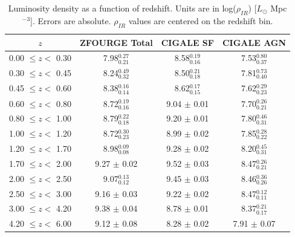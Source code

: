 \begin{table}
    \begin{center}
    \caption{Luminosity density as a function of redshift. Units are in log($\rho_{IR}$) [$L_{\odot}$ Mpc$^{-3}$]. Errors are absolute. $\rho_{IR}$ values are centered on the redshift bin.}
    \label{Tab: SFRD}
    \begin{tabular}{@{}cccc@{}}
        \toprule
        $z$ & ZFOURGE Total & CIGALE SF & CIGALE AGN \\
        \hline
        0.00 $\leq z <$ 0.30 & 7.98$^{0.27}_{0.21}$ & 8.58$^{0.19}_{0.16}$  & 7.53$^{0.80}_{0.37}$ \\
        0.30 $\leq z <$ 0.45 & 8.24$^{0.49}_{0.32}$ & 8.50$^{0.21}_{0.18}$  & 7.81$^{0.73}_{0.40}$ \\
        0.45 $\leq z <$ 0.60 & 8.38$^{0.16}_{0.14}$ & 8.62$^{0.17}_{0.15}$  & 7.62$^{0.29}_{0.23}$ \\
        0.60 $\leq z <$ 0.80 & 8.72$^{0.19}_{0.16}$ & 9.04 $\pm$ 0.01       & 7.70$^{0.26}_{0.21}$ \\
        0.80 $\leq z <$ 1.00 & 8.79$^{0.22}_{0.18}$ & 9.20 $\pm$ 0.01       & 7.80$^{0.46}_{0.31}$ \\
        1.00 $\leq z <$ 1.20 & 8.72$^{0.30}_{0.23}$ & 8.99 $\pm$ 0.02       & 7.85$^{0.28}_{0.22}$ \\
        1.20 $\leq z <$ 1.70 & 8.98$^{0.09}_{0.08}$ & 9.28 $\pm$ 0.02       & 8.20$^{0.45}_{0.31}$ \\
        1.70 $\leq z <$ 2.00 & 9.27 $\pm$ 0.02      & 9.52 $\pm$ 0.03       & 8.47$^{0.26}_{0.21}$ \\
        2.00 $\leq z <$ 2.50 & 9.07$^{0.13}_{0.12}$ & 9.45 $\pm$ 0.03       & 8.46$^{0.36}_{0.26}$ \\
        2.50 $\leq z <$ 3.00 & 9.16 $\pm$ 0.03      & 9.22 $\pm$ 0.02       & 8.47$^{0.12}_{0.11}$ \\
        3.00 $\leq z <$ 4.20 & 9.38 $\pm$ 0.04      & 8.78 $\pm$ 0.01       & 8.37$^{0.21}_{0.17}$ \\
        4.20 $\leq z <$ 6.00 & 9.12 $\pm$ 0.08      & 8.28 $\pm$ 0.02       & 7.91 $\pm$ 0.07 \\
        \bottomrule
    \end{tabular}
    \end{center}        
\end{table}


